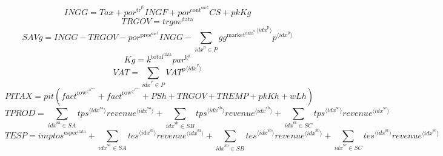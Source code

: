 \begin{equation}
{I\!N\!G\!G} = {T\!a\!x} + {{p\!o\!r}^{\mathrm{tr}^{\mathrm{f}^{\mathrm{g}}}}} {{I\!N\!G\!F}} + {{p\!o\!r}^{\mathrm{cont}^{\mathrm{soc}^{\mathrm{g}}}}} {{C\!S}} + {{p\!k}} {{K\!g}}
\end{equation}
\begin{equation}
{T\!R\!G\!O\!V} = {t\!r\!g\!o\!v}^{\mathrm{data}}
\end{equation}
\begin{equation}
{S\!A\!V\!g} = {I\!N\!G\!G} - {T\!R\!G\!O\!V} - {{p\!o\!r}^{\mathrm{pres}^{\mathrm{soc}^{\mathrm{g}}}}} {{I\!N\!G\!G}} - \sum_{{i\!d\!x}^{\mathrm{p}}\in P} {{{g\!g}^{\mathrm{market}^{\mathrm{data}^{\mathrm{p}}}}}^{\langle {i\!d\!x}^{\mathrm{p}}\rangle}} {{p}^{\langle {i\!d\!x}^{\mathrm{p}}\rangle}}
\end{equation}
\begin{equation}
{K\!g} = {k^{\mathrm{total}^{\mathrm{data}}}} {{p\!a\!r}^{\mathrm{k}^{\mathrm{g}}}}
\end{equation}
\begin{equation}
{V\!A\!T} = \sum_{{i\!d\!x}^{\mathrm{v}}\in P} {{V\!A\!T}^{\mathrm{p}}}^{\langle {i\!d\!x}^{\mathrm{v}}\rangle}
\end{equation}
\begin{equation}
{P\!I\!T\!A\!X} = {{p\!i\!t}} \left({f\!a\!c\!t}^{\mathrm{row}^{\in^{\mathrm{k}^{\mathrm{data}}}}} + {f\!a\!c\!t}^{\mathrm{row}^{\in^{\mathrm{l}^{\mathrm{data}}}}} + {P\!S\!h} + {T\!R\!G\!O\!V} + {T\!R\!E\!M\!P} + {{p\!k}} {{K\!h}} + {w} {{L\!h}}\right)
\end{equation}
\begin{equation}
{T\!P\!R\!O\!D} = \sum_{{i\!d\!x}^{\mathrm{sa}}\in {S\!A}} {{{t\!p\!s}}^{\langle {i\!d\!x}^{\mathrm{sa}}\rangle}} {{{r\!e\!v\!e\!n\!u\!e}}^{\langle {i\!d\!x}^{\mathrm{sa}}\rangle}} + \sum_{{i\!d\!x}^{\mathrm{sb}}\in {S\!B}} {{{t\!p\!s}}^{\langle {i\!d\!x}^{\mathrm{sb}}\rangle}} {{{r\!e\!v\!e\!n\!u\!e}}^{\langle {i\!d\!x}^{\mathrm{sb}}\rangle}} + \sum_{{i\!d\!x}^{\mathrm{sc}}\in {S\!C}} {{{t\!p\!s}}^{\langle {i\!d\!x}^{\mathrm{sc}}\rangle}} {{{r\!e\!v\!e\!n\!u\!e}}^{\langle {i\!d\!x}^{\mathrm{sc}}\rangle}}
\end{equation}
\begin{equation}
{T\!E\!S\!P} = {i\!m\!p\!t\!o\!s}^{\mathrm{espec}^{\mathrm{data}}} + \sum_{{i\!d\!x}^{\mathrm{sa}}\in {S\!A}} {{{t\!e\!s}}^{\langle {i\!d\!x}^{\mathrm{sa}}\rangle}} {{{r\!e\!v\!e\!n\!u\!e}}^{\langle {i\!d\!x}^{\mathrm{sa}}\rangle}} + \sum_{{i\!d\!x}^{\mathrm{sb}}\in {S\!B}} {{{t\!e\!s}}^{\langle {i\!d\!x}^{\mathrm{sb}}\rangle}} {{{r\!e\!v\!e\!n\!u\!e}}^{\langle {i\!d\!x}^{\mathrm{sb}}\rangle}} + \sum_{{i\!d\!x}^{\mathrm{sc}}\in {S\!C}} {{{t\!e\!s}}^{\langle {i\!d\!x}^{\mathrm{sc}}\rangle}} {{{r\!e\!v\!e\!n\!u\!e}}^{\langle {i\!d\!x}^{\mathrm{sc}}\rangle}}
\end{equation}
